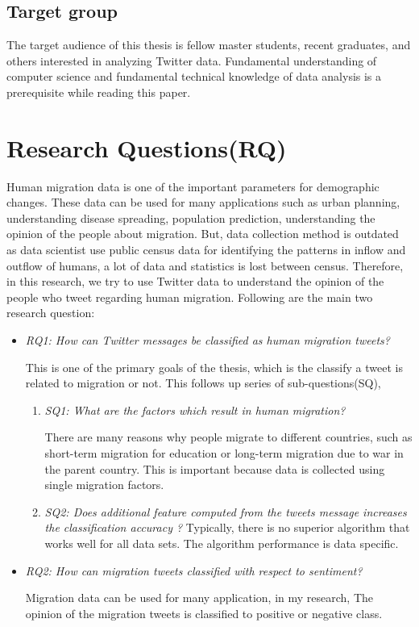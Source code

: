 \subsection{Target group}
The target audience of this thesis is fellow master students, recent graduates, and others interested in analyzing Twitter data. Fundamental understanding of computer science and fundamental technical knowledge of data analysis is a prerequisite while reading this paper.

\section{Research Questions(RQ)}
Human migration data is one of the important parameters for demographic changes. These data can be used for many applications such as urban planning, understanding disease spreading,  population prediction, understanding the opinion of the people about migration. But, data collection method
is outdated as data scientist use public census data for identifying the patterns in inflow and outflow of humans, a lot of data and statistics is lost between census. Therefore, in this research, we try to use Twitter data to understand the opinion of the people who tweet regarding human migration. Following are the main two research question:

\begin{itemize}

    \item  \textit{RQ1: How can Twitter messages be classified as human migration tweets?}
    
    This is one of the primary goals of the thesis, which is the classify a tweet is related to migration or not. This follows up series of sub-questions(SQ),
    
    \begin{enumerate}
        \item \textit{SQ1: What are the factors which result in human migration?}
        
        There are many reasons why people migrate to different countries, such as short-term migration for education or long-term migration due to war in the parent country. This is important because data is collected using single migration factors. 
        \item \textit{SQ2: Does additional feature computed from the tweets message increases the classification accuracy ?}
        Typically, there is no superior algorithm that works well for all data sets. The algorithm performance is data specific. 
        
    \end{enumerate}
    
    
  
    
    \item \textit{RQ2: How can migration tweets classified with respect to sentiment?}
    
    Migration data can be used for many application, in my research, The opinion of the migration tweets is classified to positive or negative class.
\end{itemize}




